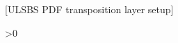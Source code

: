 %
%

[ULSBS PDF transposition layer setup]

\newcount\ulsbs@pdfsongcount
\newif\ifulsbs@pdfsong
\newif\ifulsbs@pdfchord
\newif\ifulsbs@pdfrightalign
\newif\ifulsbs@pdfdraftpass
\ifulsbs@pdflayers
  \ifnum\draftmode>0\relax\ulsbs@pdfdraftpasstrue\fi
\fi
\newif\ifulsbs@keytranspose\ulsbs@keytransposetrue
\newsavebox{\ulsbs@pdfbasebox}
\newsavebox{\ulsbs@pdfaltbox}
\newsavebox{\ulsbs@pdfresultbox}
\newsavebox{\ulsbs@pdfanchorbox}

